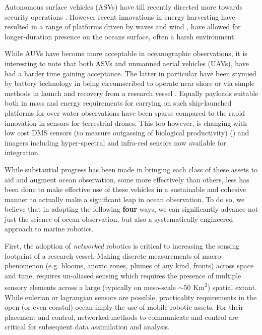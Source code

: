 \documentclass[12pt]{article}
\begin{document}
Autonomous surface vehicles (ASVs) have till recently directed more
towards security operations \cite{wolf10}. However recent innovations
in energy harvesting have resulted in a range of platforms driven by
waves \cite{waveglider,verfuss19} and wind \cite{gentemann20,ghani14},
have allowed for longer-duration presence on the oceans surface, often
a harsh environment.

While AUVs have become more acceptable in oceanographic observations,
it is interesting to note that both ASVs and unmanned aerial vehicles
(UAVs), have had a harder time gaining acceptance. The latter in
particular have been stymied by battery technology in being
circumscribed to operate near shore or via simple methods in launch
and recovery from a research vessel \cite{Ferreira2018}. Equally
payloads suitable both in mass and energy requirements for carrying on
such ship-launched platforms for over water observations have been
sparse compared to the rapid innovation in sensors for terrestrial
drones. This too however, is changing with low cost DMS sensors (to
measure outgassing of biological productivity) () and imagers
including hyper-spectral \cite{sigernes18} and infra-red sensors now
available for integration.

While substantial progress has been made in bringing each class of
these assets to aid and augment ocean observation, some more
effectively than others, less has been done to make effective use of
these vehicles in a sustainable and cohesive manner to actually make a
significant leap in ocean observation. To do so, we believe that in
adopting the following \textbf{four} ways, we can significantly
advance not just the science of ocean observation, but also a
systematically engineered approach to marine robotics.

First, the adoption of \emph{networked} robotics is critical to
increasing the sensing footprint of a research vessel. Making discrete
measurements of macro-phenomenon (e.g. blooms, anoxic zones, plumes of
any kind, fronts) across space and time, requires un-aliased sensing
which requires the presence of multiple sensory elements across a
large (typically on meso-scale $\sim 50$ Km\textsuperscript{2})
spatial extant. While eulerian or lagrangian sensors are possible,
practicality requirements in the open (or even coastal) ocean imply
the use of mobile robotic assets. For their placement and control,
networked methods to communicate and control are critical for
subsequent data assimilation and analysis.
\end{document}
